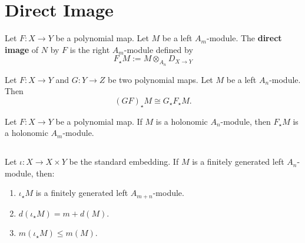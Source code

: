 \documentclass[12pt, oneside]{book}
\begin{document}
\section{Direct Image}

\begin{definition}
    Let $F: X \rightarrow Y$ be a polynomial map. Let $M$ be a left $A_m$-module.
    The \textbf{direct image} of $N$ by $F$ is the right $A_m$-module defined by
    \begin{equation*}
        F_\star M
        :=
        M\otimes_{A_n} D_{X\rightarrow Y}
    \end{equation*}

\end{definition}

\begin{theorem}
    Let $F: X \rightarrow Y$ and $G: Y \rightarrow Z$ be two polynomial maps. Let $M$ be a left $A_n$-module. Then
    \begin{equation*}
        (G F)_{\star} M \cong G_{\star} F_{\star} M .
    \end{equation*}
\end{theorem}




\begin{theorem}
    Let $F: X \rightarrow Y$ be a polynomial map.
    If $M$ is a holonomic $A_n$-module, then $F_{\star} M$ is a holonomic $A_m$-module.
\end{theorem}




\subsection{}
\begin{theorem}
    Let $\iota: X \rightarrow X \times Y$ be the standard embedding. If $M$ is a finitely generated left $A_n$-module, then:
    \begin{enumerate}
        \item
              $\iota_{\star} M$ is a finitely generated left $A_{m+n}$-module.

        \item  $d\left(\iota_{\star} M\right)=m+d(M)$.

        \item
              $m\left(\iota_{\star} M\right) \leq m(M)$.
    \end{enumerate}
\end{theorem}
\end{document}
